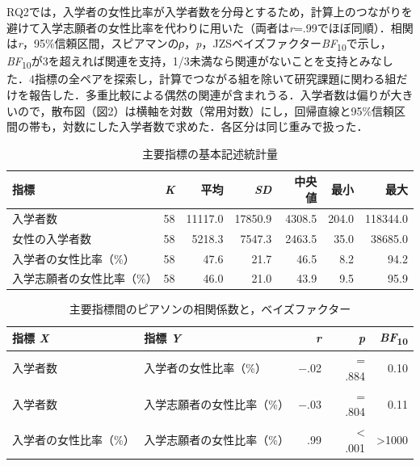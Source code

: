 \documentclass[a4paper,10pt,twocolumn]{ltjsarticle}
\begin{document}
RQ2では，入学者の女性比率が入学者数を分母とするため，計算上のつながりを避けて入学志願者の女性比率を代わりに用いた（両者は\textit{r}=.99でほぼ同順）．相関は\textit{r}，95\%信頼区間，スピアマンの\textit{ρ}，\textit{p}，JZSベイズファクター\textit{BF}\textsubscript{10}で示し，\textit{BF}\textsubscript{10}が3を超えれば関連を支持，1/3未満なら関連がないことを支持とみなした．4指標の全ペアを探索し，計算でつながる組を除いて研究課題に関わる組だけを報告した．多重比較による偶然の関連が含まれうる．入学者数は偏りが大きいので，散布図（図2）は横軸を対数（常用対数）にし，回帰直線と95\%信頼区間の帯も，対数にした入学者数で求めた．各区分は同じ重みで扱った．
\begin{table}[!t]
\caption{主要指標の基本記述統計量}
\centering\small
\begin{tabular}{>{\raggedright\arraybackslash}p{9.2cm}rrrrrr}
\toprule
指標 & \textit{K} & 平均 & \textit{SD} & 中央値 & 最小 & 最大 \\
\midrule
入学者数 & 58 & 11117.0 & 17850.9 & 4308.5 & 204.0 & 118344.0 \\
女性の入学者数 & 58 & 5218.3 & 7547.3 & 2463.5 & 35.0 & 38685.0 \\
入学者の女性比率（\%） & 58 & 47.6 & 21.7 & 46.5 & 8.2 & 94.2 \\
入学志願者の女性比率（\%） & 58 & 46.0 & 21.0 & 43.9 & 9.5 & 95.9 \\
\bottomrule
\end{tabular}
\par{}
\end{table}
\begin{table}[!t]
\caption{主要指標間のピアソンの相関係数と，ベイズファクター}
\centering\small
\begin{tabular}{>{\raggedright\arraybackslash}p{6.4cm}>{\raggedright\arraybackslash}p{6.4cm}rrr}
\toprule
指標 \textit{X} & 指標 \textit{Y} & \textit{r} & \textit{p} & \textit{BF}\textsubscript{10} \\
\midrule
入学者数 & 入学者の女性比率（\%） & −.02 & = .884 & 0.10 \\
入学者数 & 入学志願者の女性比率（\%） & −.03 & = .804 & 0.11 \\
入学者の女性比率（\%） & 入学志願者の女性比率（\%） & .99 & < .001 & >1000 \\
\bottomrule
\end{tabular}
\par{}
\end{table}
\end{document}
